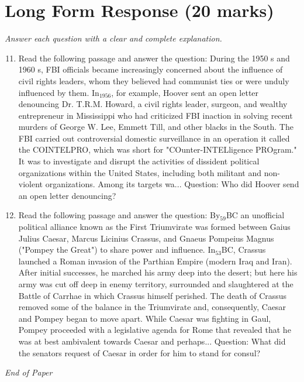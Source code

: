 \documentclass[12pt]{article}
\begin{document}
\section*{Long Form Response (20 marks)}
\textit{Answer each question with a clear and complete explanation.}
\begin{enumerate}[label=\arabic*.]
\setcounter{enumi}{10}
\item Read the following passage and answer the question: During the 1950 s and 1960 s, FBI officials became increasingly concerned about the influence of civil rights leaders, whom they believed had communist ties or were unduly influenced by them. In$_{1956}$, for example, Hoover sent an open letter denouncing Dr. T.R.M. Howard, a civil rights leader, surgeon, and wealthy entrepreneur in Mississippi who had criticized FBI inaction in solving recent murders of George W. Lee, Emmett Till, and other blacks in the South. The FBI carried out controversial domestic surveillance in an operation it called the COINTELPRO, which was short for "COunter-INTELligence PROgram." It was to investigate and disrupt the activities of dissident political organizations within the United States, including both militant and non-violent organizations. Among its targets wa... Question: Who did Hoover send an open letter denouncing?
\item Read the following passage and answer the question: By$_{59}$BC an unofficial political alliance known as the First Triumvirate was formed between Gaius Julius Caesar, Marcus Licinius Crassus, and Gnaeus Pompeius Magnus ("Pompey the Great") to share power and influence. In$_{53}$BC, Crassus launched a Roman invasion of the Parthian Empire (modern Iraq and Iran). After initial successes, he marched his army deep into the desert; but here his army was cut off deep in enemy territory, surrounded and slaughtered at the Battle of Carrhae in which Crassus himself perished. The death of Crassus removed some of the balance in the Triumvirate and, consequently, Caesar and Pompey began to move apart. While Caesar was fighting in Gaul, Pompey proceeded with a legislative agenda for Rome that revealed that he was at best ambivalent towards Caesar and perhaps... Question: What did the senators request of Caesar in order for him to stand for consul?
\end{enumerate}

\vfill
\noindent\textit{End of Paper}
\end{document}
